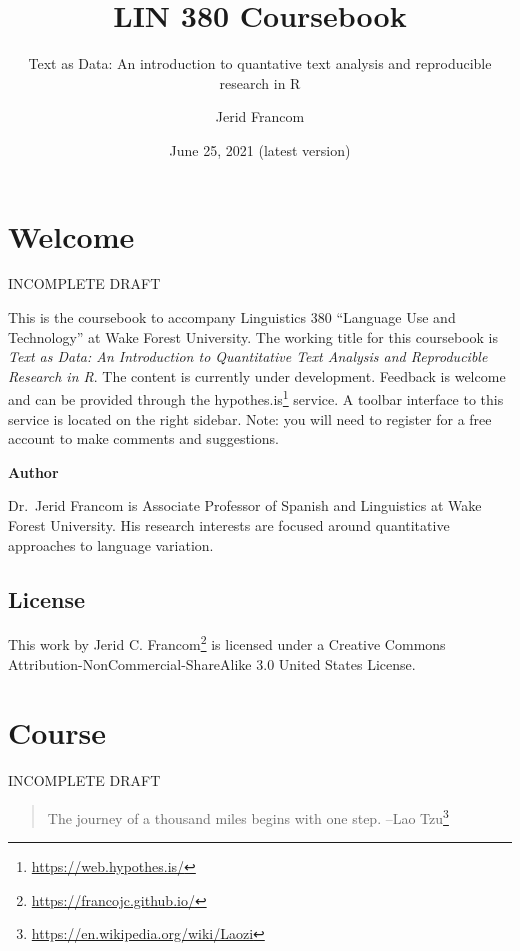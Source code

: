 \documentclass[
]{article}
\title{LIN 380 Coursebook}
\subtitle{Text as Data: An introduction to quantative text analysis and reproducible research in R}
\author{Jerid Francom}
\date{June 25, 2021 (latest version)}
\DeclareRobustCommand{\href}[2]{#2\footnote{\url{#1}}}
\begin{document}
\maketitle

{
\setcounter{tocdepth}{2}
\tableofcontents
}
\hypertarget{welcome}{%
\section*{Welcome}\label{welcome}}

INCOMPLETE DRAFT

This is the coursebook to accompany Linguistics 380 ``Language Use and Technology'' at Wake Forest University. The working title for this coursebook is \emph{Text as Data: An Introduction to Quantitative Text Analysis and Reproducible Research in R}. The content is currently under development. Feedback is welcome and can be provided through the \href{https://web.hypothes.is/}{hypothes.is} service. A toolbar interface to this service is located on the right sidebar. Note: you will need to register for a free account to make comments and suggestions.

\textbf{Author}

Dr.~Jerid Francom is Associate Professor of Spanish and Linguistics at Wake Forest University. His research interests are focused around quantitative approaches to language variation.

\hypertarget{license}{%
\subsection*{License}\label{license}}

This work by \href{https://francojc.github.io/}{Jerid C. Francom} is licensed under a Creative Commons Attribution-NonCommercial-ShareAlike 3.0 United States License.

\hypertarget{course}{%
\section*{Course}\label{course}}

INCOMPLETE DRAFT

\begin{quote}
The journey of a thousand miles begins with one step.
--\href{https://en.wikipedia.org/wiki/Laozi}{Lao Tzu}
\end{quote}
\end{document}
